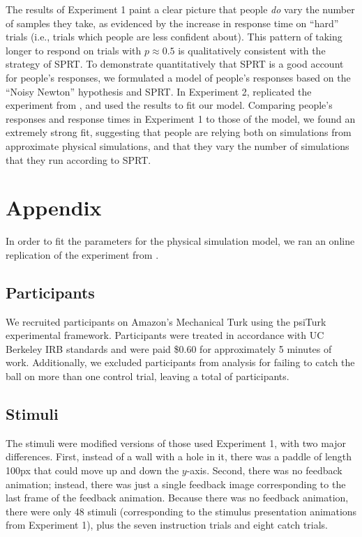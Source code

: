 \documentclass[10pt,letterpaper]{article}
\begin{document}
The results of Experiment 1 paint a clear picture that people \emph{do} vary the number of samples they take, as evidenced by the increase in response time on ``hard'' trials (i.e., trials which people are less confident about).
This pattern of taking longer to respond on trials with $p\approx 0.5$ is qualitatively consistent with the strategy of SPRT.
To demonstrate quantitatively that SPRT is a good account for people's responses, we formulated a model of people's responses based on the ``Noisy Newton'' hypothesis and SPRT.
In Experiment 2, replicated the experiment from , and used the results to fit our model.
Comparing people's responses and response times in Experiment 1 to those of the model, we found an extremely strong fit, suggesting that people are relying both on simulations from approximate physical simulations, and that they vary the number of simulations that they run according to SPRT.

\section{Appendix}

In order to fit the parameters for the physical simulation model, we ran an online replication of the experiment from .

\subsection{Participants}

We recruited \PaddleNumComplete{} participants on Amazon's Mechanical Turk using the psiTurk \cite{McDonnell12} experimental framework.
Participants were treated in accordance with UC Berkeley IRB standards and were paid \$0.60 for approximately 5 minutes of work.
Additionally, we excluded \PaddleNumFailed{} participants from analysis for failing to catch the ball on more than one control trial, leaving a total of \PaddleNumOk{} participants.

\subsection{Stimuli}

The stimuli were modified versions of those used Experiment 1, with two major differences.
First, instead of a wall with a hole in it, there was a paddle of length 100px that could move up and down the $y$-axis.
Second, there was no feedback animation; instead, there was just a single feedback image corresponding to the last frame of the feedback animation.
Because there was no feedback animation, there were only 48 stimuli (corresponding to the stimulus presentation animations from Experiment 1), plus the seven instruction trials and eight catch trials.
\end{document}
